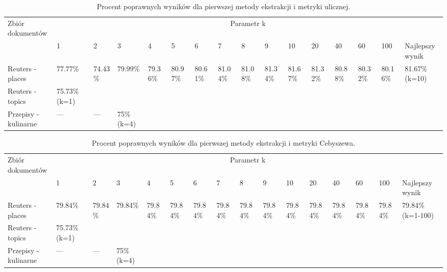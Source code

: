 \documentclass{classrep}
\begin{document}

\begingroup
{\scriptsize  
\setlength{\LTleft}{-20cm plus -1fill}
\setlength{\LTright}{\LTleft}

\begin{longtable}{|p{1cm}|p{0.7cm}|p{0.7cm}|p{0.7cm}|p{0.7cm}|p{0.7cm}|p{0.7cm}|p{0.7cm}|p{0.7cm}|p{0.7cm}|p{0.7cm}|p{0.7cm}|p{0.7cm}|p{0.7cm}|p{0.7cm}|p{1.1cm}|}
\caption{ Procent poprawnych wyników dla pierwszej metody ekstrakcji i metryki ulicznej.}\\ 
\hline

Zbiór
dokumentów

 &\multicolumn{15}{c|}{Parametr k}\\
\cline{2-16}
& 1
& 2
& 3
& 4
& 5
& 6
& 7
& 8
& 9
& 10
& 20
& 40
& 60
& 100
& Najlepszy wynik
\\ \hline\hline
Reuters
- places
& 77.77\%	%
& 74.43\%	%
& 79.99\%	%
& 79.36\%	%
& 80.97\%	%
& 80.61\%	%
& 81.04\%	%
& 81.08\%	%
& 81.34\%	%
& 81.67\%	%
& 81.32\%	%
& 80.88\%	%
& 80.32\%	%
& 80.16\%	%
& 81.67\% (k=10)
\\ \hline
Reuters
- topics
& 75.73\%	(k=1)
\\ \hline
Przepisy
- kulinarne 

& ---		%
& ---		%
& 75\% (k=4)
\\ \hline
\end{longtable}
}
\endgroup




\begingroup
{\scriptsize  
\setlength{\LTleft}{-20cm plus -1fill}
\setlength{\LTright}{\LTleft}

\begin{longtable}{|p{1cm}|p{0.7cm}|p{0.7cm}|p{0.7cm}|p{0.7cm}|p{0.7cm}|p{0.7cm}|p{0.7cm}|p{0.7cm}|p{0.7cm}|p{0.7cm}|p{0.7cm}|p{0.7cm}|p{0.7cm}|p{0.7cm}|p{1.1cm}|}
\caption{ Procent poprawnych wyników dla pierwszej metody ekstrakcji i metryki Cebyszewa.}\\ 
\hline

Zbiór
dokumentów

 &\multicolumn{15}{c|}{Parametr k}\\
\cline{2-16}
& 1
& 2
& 3
& 4
& 5
& 6
& 7
& 8
& 9
& 10
& 20
& 40
& 60
& 100
& Najlepszy wynik
\\ \hline\hline
Reuters
- places
& 79.84\%	%
& 79.84\%	%
& 79.84\%	%
& 79.84\%	%
& 79.84\%	%
& 79.84\%	%
& 79.84\%	%
& 79.84\%	%
& 79.84\%	%
& 79.84\%	%
& 79.84\%	%
& 79.84\%	%
& 79.84\%	%
& 79.84\%	%
& 79.84\% (k=1-100)
\\ \hline
Reuters
- topics
& 75.73\%	(k=1)
\\ \hline
Przepisy
- kulinarne 

& ---		%
& ---		%
& 75\% (k=4)
\\ \hline
\end{longtable}
}
\endgroup
\end{document}
